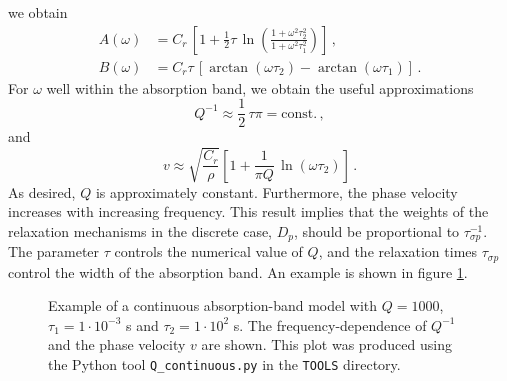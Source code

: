 we obtain
\begin{align}\label{E:Qconst007}
A(\omega)&=C_r\,\left[1+\frac{1}{2}\tau\,\ln\left(\frac{1+\omega^2\tau_2^2}{1+\omega^2 \tau_1^2}  \right)\right]\,,\\
B(\omega)&=C_r\tau\,\left[\arctan(\omega\tau_2)-\arctan(\omega\tau_1) \right]\,.
\end{align}
For $\omega$ well within the absorption band, we obtain the useful approximations
\begin{equation}\label{E:Qconst008}
Q^{-1}\approx\frac{1}{2}\,\tau\pi = \text{const.}\,,
\end{equation}
and
\begin{equation}\label{E:Qconst009}
v\approx \sqrt{\frac{C_r}{\rho}} \left[1+\frac{1}{\pi Q}\,\ln(\omega\tau_2)\right]\,.
\end{equation}
As desired, $Q$ is approximately constant. Furthermore, the phase velocity increases with increasing frequency. This result implies that the weights of the relaxation mechanisms in the discrete case, $D_p$, should be proportional to $\tau_{\sigma p}^{-1}$. The parameter $\tau$ controls the numerical value of $Q$, and the relaxation times $\tau_{\sigma p}$ control the width of the absorption band. An example is shown in figure \ref{F:absorption_continuous}.
\begin{center}
\begin{figure}
\center{} 
\caption{Example of a continuous absorption-band model with $Q=1000$, $\tau_1=1\cdot 10^{-3}$ s and $\tau_2=1\cdot 10^{2}$ s. The frequency-dependence of $Q^{-1}$ and the phase velocity $v$ are shown. This plot was produced using the Python tool \texttt{Q\_continuous.py} in the \texttt{TOOLS} directory.}\label{F:absorption_continuous}
\end{figure}
\end{center}

